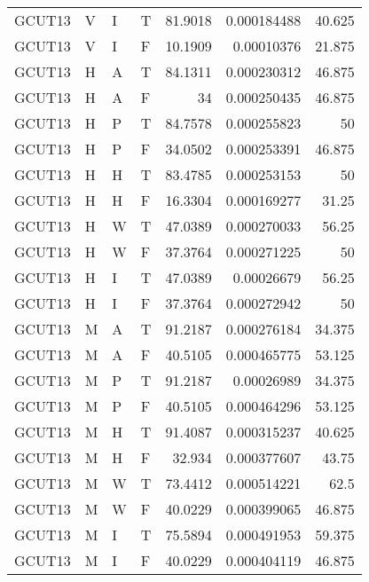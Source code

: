 \begin{longtable}{llllrrr}
    GCUT13   & V     & I     & T          & 81.9018    & 0.000184488 & 40.625   \\
    GCUT13   & V     & I     & F          & 10.1909    & 0.00010376  & 21.875   \\
    GCUT13   & H     & A     & T          & 84.1311    & 0.000230312 & 46.875   \\
    GCUT13   & H     & A     & F          & 34         & 0.000250435 & 46.875   \\
    GCUT13   & H     & P     & T          & 84.7578    & 0.000255823 & 50       \\
    GCUT13   & H     & P     & F          & 34.0502    & 0.000253391 & 46.875   \\
    GCUT13   & H     & H     & T          & 83.4785    & 0.000253153 & 50       \\
    GCUT13   & H     & H     & F          & 16.3304    & 0.000169277 & 31.25    \\
    GCUT13   & H     & W     & T          & 47.0389    & 0.000270033 & 56.25    \\
    GCUT13   & H     & W     & F          & 37.3764    & 0.000271225 & 50       \\
    GCUT13   & H     & I     & T          & 47.0389    & 0.00026679  & 56.25    \\
    GCUT13   & H     & I     & F          & 37.3764    & 0.000272942 & 50       \\
    GCUT13   & M     & A     & T          & 91.2187    & 0.000276184 & 34.375   \\
    GCUT13   & M     & A     & F          & 40.5105    & 0.000465775 & 53.125   \\
    GCUT13   & M     & P     & T          & 91.2187    & 0.00026989  & 34.375   \\
    GCUT13   & M     & P     & F          & 40.5105    & 0.000464296 & 53.125   \\
    GCUT13   & M     & H     & T          & 91.4087    & 0.000315237 & 40.625   \\
    GCUT13   & M     & H     & F          & 32.934     & 0.000377607 & 43.75    \\
    GCUT13   & M     & W     & T          & 73.4412    & 0.000514221 & 62.5     \\
    GCUT13   & M     & W     & F          & 40.0229    & 0.000399065 & 46.875   \\
    GCUT13   & M     & I     & T          & 75.5894    & 0.000491953 & 59.375   \\
    GCUT13   & M     & I     & F          & 40.0229    & 0.000404119 & 46.875   \\

\end{longtable}
